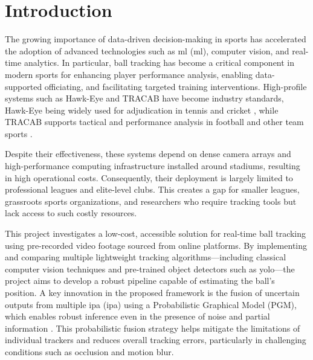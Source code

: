 \documentclass[12pt,a4paper]{article}
\begin{document}
\tableofcontents
\newpage
\listoffigures
\newpage
\listoftables
\newpage
\printacronyms[include = abbrev, name = {List of Abbreviations}]
\newpage
\printacronyms[include=symbol, name = {List of Symbols}]
\newpage

\setcounter{page}{1}
\section{Introduction}
The growing importance of data-driven decision-making in sports has accelerated the adoption of advanced technologies such as \acl{ml} (\acs{ml}), computer vision, and real-time analytics. In particular, ball tracking has become a critical component in modern sports for enhancing player performance analysis, enabling data-supported officiating, and facilitating targeted training interventions. High-profile systems such as Hawk-Eye and TRACAB have become industry standards, Hawk-Eye being widely used for adjudication in tennis and cricket \parencite{hawkeye2024}, while TRACAB supports tactical and performance analysis in football and other team sports \parencite{tracab2024}.

Despite their effectiveness, these systems depend on dense camera arrays and high-performance computing infrastructure installed around stadiums, resulting in high operational costs. Consequently, their deployment is largely limited to professional leagues and elite-level clubs. This creates a gap for smaller leagues, grassroots sports organizations, and researchers who require tracking tools but lack access to such costly resources.

This project investigates a low-cost, accessible solution for real-time ball tracking using pre-recorded video footage sourced from online platforms. By implementing and comparing multiple lightweight tracking algorithms—including classical computer vision techniques and pre-trained object detectors such as \acs{yolo}—the project aims to develop a robust pipeline capable of estimating the ball's position. A key innovation in the proposed framework is the fusion of uncertain outputs from multiple \acl{ipa} (\acs{ipa}) using a Probabilistic Graphical Model (PGM), which enables robust inference even in the presence of noise and partial information \parencite{koller2009pgm}. This probabilistic fusion strategy helps mitigate the limitations of individual trackers and reduces overall tracking errors, particularly in challenging conditions such as occlusion and motion blur.
\end{document}
